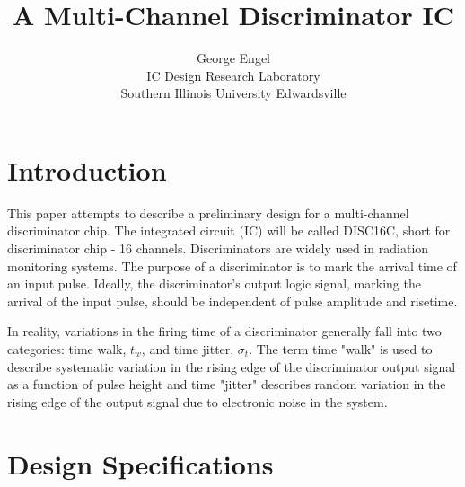 \documentclass[12pt, onecolumn]{IEEEtran}
\author{George Engel\\
IC Design Research Laboratory\\
Southern Illinois University Edwardsville\\
}
\title{A Multi-Channel Discriminator IC}
\begin{document}

\maketitle


\section*{Introduction}

\noindent
This paper attempts to describe a preliminary design for a multi-channel discriminator chip. The integrated circuit (IC) will be called DISC16C, short for discriminator chip - 16 channels. Discriminators are widely used in radiation monitoring systems.  The purpose of a discriminator is to mark the arrival time of an input pulse. Ideally, the discriminator's output logic signal, marking the arrival of the input pulse, should be independent of pulse amplitude and risetime.

\noindent
\newline
In reality, variations in the firing time of a discriminator generally fall into two categories: time walk, $t_w$, and time jitter, $\sigma_t$. The term time "walk" is used to describe systematic variation in the rising edge of the discriminator output signal as a function of pulse height and time "jitter" describes random variation in the rising edge of the output signal due to electronic noise in the system.\\  

\section*{Design Specifications}
\noindent
\end{document}
